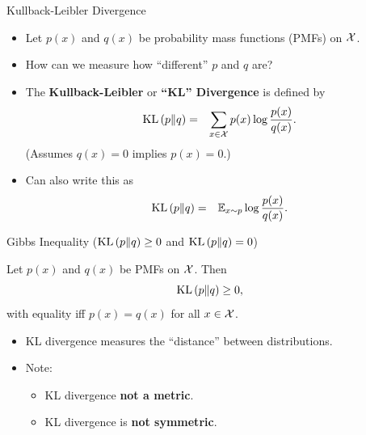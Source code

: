 \documentclass[usenames,dvipsnames,notes,11pt,aspectratio=169]{beamer}
\begin{document}
\begin{frame}{Kullback-Leibler Divergence}

\begin{itemize}
\item Let $p(x)$ and $q(x)$ be probability mass functions (PMFs) on $\mathcal{X}$. 
\item How can we measure how ``different'' $p$ and $q$ are?
\end{itemize}

\begin{itemize}
\item The \textbf{Kullback-Leibler} or \textbf{``KL'' Divergence} is defined
by
\begin{eqnarray*}
    \text{KL}\left( p \| q \right) & = & \sum_{x\in\mathcal{X}}p(x)\log\frac{p(x)}{q(x)}.
\end{eqnarray*}
(Assumes $q(x)=0$ implies $p(x)=0$.)
\end{itemize}

\begin{itemize}
\item Can also write this as
\begin{eqnarray*}
    \text{KL}\left( p \| q \right) & = & \mathbb{E}_{x\sim p}\log\frac{p(x)}{q(x)}.
\end{eqnarray*}
\end{itemize}
\end{frame}
%
\begin{frame}{Gibbs Inequality ($\text{KL}\left( p \| q \right)\ge0$ and $\text{KL}\left( p \| q \right)=0$)}
\begin{theorem}
Let $p(x)$ and $q(x)$ be PMFs on $\mathcal{X}$. Then
\[
\text{KL}\left( p \| q \right)\ge0,
\]
with equality iff $p(x)=q(x)$ for all $x\in\mathcal{X}$. 
\end{theorem}


\begin{itemize}
\item KL divergence measures the ``distance'' between distributions.
\end{itemize}

\begin{itemize}
\item Note:

\begin{itemize}
\item KL divergence \textbf{not a metric}.
\item KL divergence is \textbf{not symmetric}.
\end{itemize}
\end{itemize}
\end{frame}
%
\end{document}
